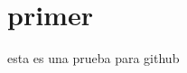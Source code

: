 \documentclass[a4paper,12pt]{article}
\begin{document}
\section{primer}
esta es una prueba para github
\end{document}
